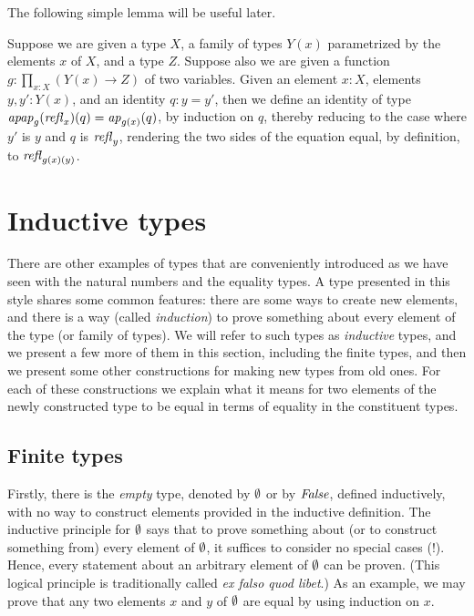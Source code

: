 The following simple lemma will be useful later.

\begin{definition}\label{def:applfun2comp}
  Suppose we are given a type $X$, a family of types $Y(x)$ parametrized by the elements $x$ of $X$, and a type $Z$.  Suppose also we are given
  a function $g : \prod_{x:X} (Y(x) \to Z)$ of two variables.  Given an element $x:X$, elements $y, y':Y(x)$, and an identity $q : y = y'$, then
  we define an identity of type $\mathop{{\it apap}_{g}(\mathop{{\it refl}_{x}})(q)} = \mathop{{\it ap}_{g(x)}}(q)$, by induction on $q$, thereby reducing to the case where $y'$ is
  $y$ and $q$ is $\mathop{{\it refl}_{y}}$, rendering the two sides of the equation equal, by definition, to $\mathop{{\it refl}_{g(x)(y)}}$.
\end{definition}


\section{Inductive types}
\label{sec:inductive-types}

There are other examples of types that are conveniently introduced as we have seen with the natural numbers and the equality types.  A type
presented in this style shares some common features: there are some ways to create new elements, and there is a way (called {\em induction}) to
prove something about every element of the type (or family of types).  We will refer to such types as {\em inductive} types, and we present a
few more of them in this section, including the finite types, and then we present some other constructions for making new types from old ones.
For each of these constructions we explain what it means for two elements of the newly constructed type to be equal in terms of equality in the
constituent types.

\subsection{Finite types}
\label{sec:finite-types}
Firstly, there is the {\em empty} type, denoted by $\emptyset$ or by $\mathop{\mathit{False}}$, defined inductively, with no way to construct elements provided in the inductive
definition.  The inductive principle for $\emptyset$ says that to prove something about (or to construct something from) every element of
$\emptyset$, it suffices to consider no special cases (!).  Hence, every statement about an arbitrary element of $\emptyset$ can be proven. (This logical principle is traditionally called {\em ex falso quod libet}.) As
an example, we may prove that any two elements $x$ and $y$ of $\emptyset$ are equal by using induction on $x$.

